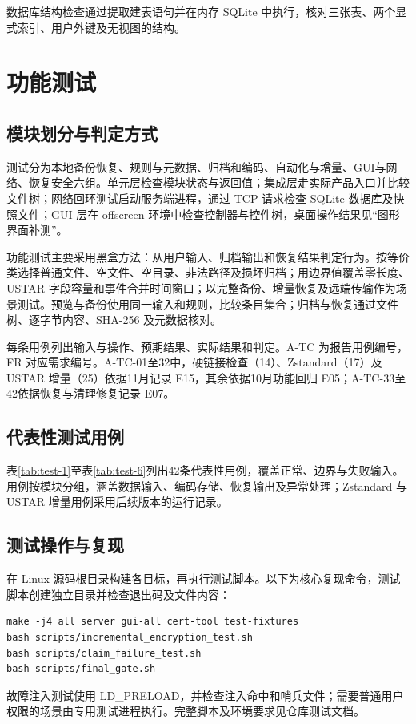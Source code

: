 数据库结构检查通过提取建表语句并在内存 SQLite 中执行，核对三张表、两个显式索引、用户外键及无视图的结构。

\section{功能测试}
\subsection{模块划分与判定方式}
测试分为本地备份恢复、规则与元数据、归档和编码、自动化与增量、GUI与网络、恢复安全六组。单元层检查模块状态与返回值；集成层走实际产品入口并比较文件树；网络回环测试启动服务端进程，通过 TCP 请求检查 SQLite 数据库及快照文件；GUI 层在 offscreen 环境中检查控制器与控件树，桌面操作结果见“图形界面补测”。

功能测试主要采用黑盒方法：从用户输入、归档输出和恢复结果判定行为。按等价类选择普通文件、空文件、空目录、非法路径及损坏归档；用边界值覆盖零长度、USTAR 字段容量和事件合并时间窗口；以完整备份、增量恢复及远端传输作为场景测试。预览与备份使用同一输入和规则，比较条目集合；归档与恢复通过文件树、逐字节内容、SHA-256 及元数据核对。

每条用例列出输入与操作、预期结果、实际结果和判定。A-TC 为报告用例编号，FR 对应需求编号。A-TC-01至32中，硬链接检查（14）、Zstandard（17）及 USTAR 增量（25）依据11月记录 E15，其余依据10月功能回归 E05；A-TC-33至42依据恢复与清理修复记录 E07。

\clearpage
\subsection{代表性测试用例}
表\ref{tab:test-1}至表\ref{tab:test-6}列出42条代表性用例，覆盖正常、边界与失败输入。用例按模块分组，涵盖数据输入、编码存储、恢复输出及异常处理；Zstandard 与 USTAR 增量用例采用后续版本的运行记录。


\subsection{测试操作与复现}
在 Linux 源码根目录构建各目标，再执行测试脚本。以下为核心复现命令，测试脚本创建独立目录并检查退出码及文件内容：
\begin{verbatim}
make -j4 all server gui-all cert-tool test-fixtures
bash scripts/incremental_encryption_test.sh
bash scripts/claim_failure_test.sh
bash scripts/final_gate.sh
\end{verbatim}
故障注入测试使用 LD\_PRELOAD，并检查注入命中和哨兵文件；需要普通用户权限的场景由专用测试进程执行。完整脚本及环境要求见仓库测试文档。

